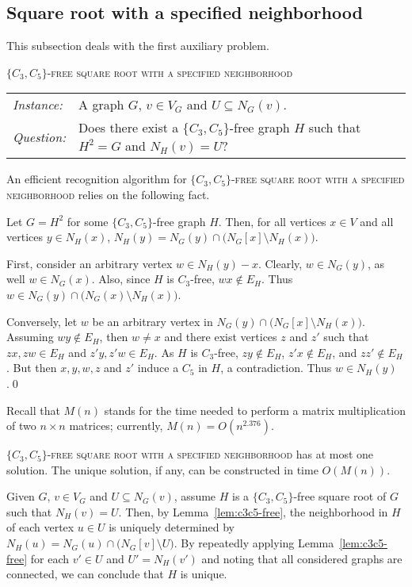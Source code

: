 \documentclass[proceedings]{stacs}
\begin{document}
\subsection{Square root with a specified neighborhood}\label{c3c5-free}
This subsection deals with the first auxiliary problem.

\textsc{$\{C_3,C_5\}$-free square root with a specified neighborhood}\\[1ex]
\begin{tabular}{l l}
{\em Instance:}& A graph $G$, $v \in V_G$ and $U \subseteq N_G(v)$. \\
{\em Question:}& Does there exist a $\{C_3,C_5\}$-free graph $H$ such that $H^2=G$ and $N_H(v) = U$?\\
\end{tabular}

An efficient recognition algorithm for \textsc{$\{C_3,C_5\}$-free square root with a specified neighborhood}
relies on the following fact.

\begin{lemma}\label{lem:c3c5-free}
Let $G=H^2$ for some $\{C_3,C_5\}$-free graph $H$. Then, for all vertices $x\in V$ and
all vertices $y\in N_H(x)$, $N_H(y)=N_G(y)\cap\big(N_G[x]\setminus N_H(x)\big)$.
\end{lemma}
\proof First, consider an arbitrary vertex $w\in N_H(y)-x$. Clearly, $w\in N_G(y)$, as well
 $w\in N_G(x)$. Also, since $H$ is $C_3$-free, $wx\not\in E_H$. Thus
 $w\in N_G(y)\cap\big(N_G(x)\setminus N_H(x)\big)$.

 Conversely, let $w$ be an arbitrary vertex in $N_G(y)\cap\big(N_G[x]\setminus N_H(x)\big)$.
 Assuming $wy\not\in E_H$, then $w\not= x$ and there exist vertices $z$ and $z'$ such that
 $zx, zw\in E_H$ and $z'y, z'w\in E_H$. As $H$ is $C_3$-free, $zy\not\in E_H$, $z'x\not\in E_H$,
 and $zz'\not\in E_H$. But then $x, y, w, z$ and $z'$ induce a $C_5$ in $H$, a contradiction.
 Thus $w\in N_H(y)$.\qed

Recall that $M(n)$ stands for the time needed to perform a matrix multiplication of two $n\times n$ matrices;
currently, $M(n) =O(n^{2.376})$.

\begin{theorem}\label{thm:c3c5-free}
\textsc{$\{C_3,C_5\}$-free square root with a specified neighborhood} has at most one solution.
The unique solution, if any, can be constructed in time $O(M(n))$.
\end{theorem}
\proof Given $G$, $v\in V_G$ and $U\subseteq N_G(v)$, assume $H$ is a $\{C_3,C_5\}$-free
square root of $G$ such that $N_H(v)=U$. Then, by Lemma~\ref{lem:c3c5-free},
the neighborhood in $H$ of each vertex $u\in U$ is uniquely determined by
$N_H(u)=N_G(u)\cap\big(N_G[v]\setminus U\big)$. By repeatedly applying Lemma~\ref{lem:c3c5-free}
for each $v'\in U$ and $U'=N_H(v')$ and noting that all considered graphs are
connected, we can conclude that $H$ is unique.
\end{document}
